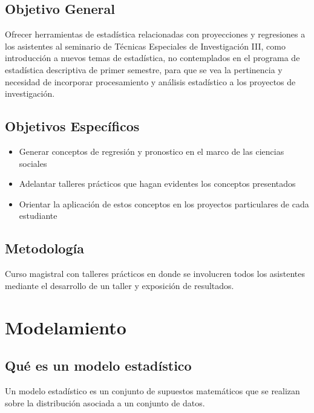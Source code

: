 \documentclass[
  letterpaper,
  DIV=11,
  numbers=noendperiod]{scrreprt}
\begin{document}
\section{Objetivo General}\label{objetivo-general}

Ofrecer herramientas de estadística relacionadas con proyecciones y
regresiones a los asistentes al seminario de Técnicas Especiales de
Investigación III, como introducción a nuevos temas de estadística, no
contemplados en el programa de estadística descriptiva de primer
semestre, para que se vea la pertinencia y necesidad de incorporar
procesamiento y análisis estadístico a los proyectos de investigación.

\section{Objetivos Específicos}\label{objetivos-especuxedficos}

\begin{itemize}
\item
  Generar conceptos de regresión y pronostico en el marco de las
  ciencias sociales
\item
  Adelantar talleres prácticos que hagan evidentes los conceptos
  presentados
\item
  Orientar la aplicación de estos conceptos en los proyectos
  particulares de cada estudiante
\end{itemize}

\section{Metodología}\label{metodologuxeda}

Curso magistral con talleres prácticos en donde se involucren todos los
asistentes mediante el desarrollo de un taller y exposición de
resultados.


\chapter{Modelamiento}\label{modelamiento}

\section{Qué es un modelo
estadístico}\label{quuxe9-es-un-modelo-estaduxedstico}

Un modelo estadístico es un conjunto de supuestos matemáticos que se
realizan sobre la distribución asociada a un conjunto de datos.
\end{document}
